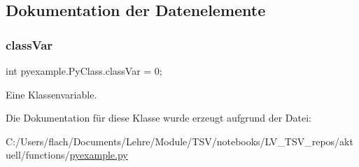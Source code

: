 \subsection{Dokumentation der Datenelemente}
\mbox{\label{classpyexample_1_1_py_class_abd17aff54e5b0ca194020c796c733546}} 
\subsubsection{\texorpdfstring{class\+Var}{classVar}}
{\footnotesize\ttfamily int pyexample.\+Py\+Class.\+class\+Var = 0;\hspace{0.3cm}{\ttfamily [static]}}



Eine Klassenvariable. 



Die Dokumentation für diese Klasse wurde erzeugt aufgrund der Datei\+:\begin{DoxyCompactItemize}
\item 
C\+:/\+Users/flach/\+Documents/\+Lehre/\+Module/\+T\+S\+V/notebooks/\+L\+V\+\_\+\+T\+S\+V\+\_\+repos/aktuell/functions/\mbox{\hyperlink{pyexample_8py}{pyexample.\+py}}\end{DoxyCompactItemize}
